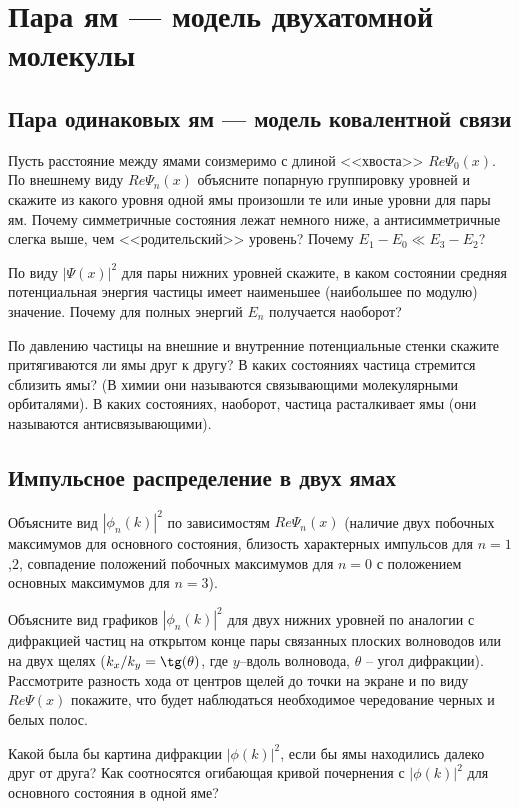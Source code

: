 \documentclass[12pt]{article}
\begin{document}
\hypertarget{double_well}{}\section{Пара ям --- модель двухатомной
молекулы}
\hypertarget{double_equal_well1}{}\subsection{Пара одинаковых
ям --- модель ковалентной связи}
Пусть расстояние между ямами соизмеримо с длиной <<хвоста>>
$Re \Psi_0(x)$. По внешнему виду $Re \Psi_n(x)$  объясните
попарную группировку  уровней и скажите из какого  уровня одной
ямы произошли те или иные уровни для  пары ям. Почему
симметричные состояния лежат немного ниже, а
антисимметричные слегка выше, чем <<родительский>> уровень?
Почему  $E_1-E_0 \ll E_3-E_2$?

По виду $|\Psi (x)|^2$ для пары нижних уровней
скажите, в каком состоянии средняя  потенциальная  энергия
частицы имеет наименьшее  (наибольшее  по  модулю) значение.
Почему для полных энергий $E_n$ получается наоборот?

По давлению частицы на  внешние и внутренние потенциальные стенки
скажите  притягиваются   ли  ямы  друг  к   другу?  В  каких
состояниях  частица  стремится  сблизить  ямы?  (В химии они
называются связывающими молекулярными орбиталями).
В каких состояниях, наоборот, частица расталкивает ямы (они
называются антисвязывающими).

\hypertarget{double_equal_well1_k}{}\subsection{Импульсное
распределение в двух ямах}
Объясните вид $|\phi_n(k)|^2$ по зависимостям $Re
\Psi_n(x)$  (наличие  двух  побочных  максимумов  для  основного
состояния,  близость характерных импульсов для $n=1$,$2$,
совпадение положений  побочных максимумов  для $n=0$ с положением
основных максимумов для $n=3$).

Объясните  вид графиков $|\phi_n(k)|^2$ для  двух нижних уровней
по  аналогии с дифракцией  частиц на открытом  конце
пары  связанных   плоских  волноводов  или   на  двух  щелях
($k_x/k_y=\tg(\theta)$,  где $y$--вдоль волновода, $\theta$ --
угол  дифракции). Рассмотрите разность хода от центров щелей до
точки на экране и по виду $Re \Psi(x)$ покажите, что будет
наблюдаться необходимое чередование черных и белых полос.

Какой была  бы картина дифракции $|\phi(k)|^2$,  если бы ямы
находились далеко  друг от друга?  Как соотносятся огибающая
кривой  почернения с $|\phi(k)|^2$ для  основного состояния в
одной яме?
\end{document}
